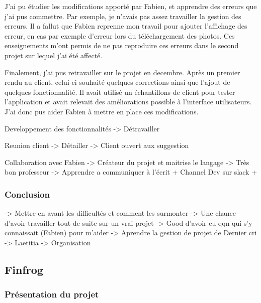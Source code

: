 \documentclass[12pt,a4paper]{article}
\begin{document}
  \bigskip

  J'ai pu étudier les modifications apporté par Fabien, et apprendre des
  erreurs que j'ai pus commettre. Par exemple, je n'avais pas assez
  travailler la gestion des erreurs. Il a fallut que Fabien reprenne mon
  travail pour ajouter l'affichage des erreur, en cas par exemple d'erreur
  lors du téléchargement des photos. Ces enseignements m'ont permis de ne
  pas reproduire ces erreurs dans le second projet sur lequel j'ai été
  affecté.

  \bigskip

  Finalement, j'ai pus retravailler sur le projet en decembre. Après un
  premier rendu au client, celui-ci souhaité quelques corrections ainsi
  que l'ajout de quelques fonctionnalité. Il avait utilisé un échantillons
  de client pour tester l'application et avait relevait des améliorations
  possible à l'interface utilisateurs. J'ai donc pus aider Fabien à mettre
  en place ces modifications.

  Developpement des fonctionnalités -\textgreater{} Détravailler

  Reunion client -\textgreater{} Détailler -\textgreater{} Client ouvert
  aux suggestion

  Collaboration avec Fabien -\textgreater{} Créateur du projet et maitrise
  le langage -\textgreater{} Très bon professeur -\textgreater{} Apprendre
  a communiquer à l'écrit + Channel Dev sur slack +

  \bigskip

  \subsubsection{Conclusion}\label{conclusion}

  -\textgreater{} Mettre en avant les difficultés et comment les surmonter
  -\textgreater{} Une chance d'avoir travailler tout de suite sur un vrai
  projet -\textgreater{} Good d'avoir eu qqn qui s'y connaissait (Fabien)
  pour m'aider -\textgreater{} Aprendre la gestion de projet de Dernier
  cri -\textgreater{} Laetitia -\textgreater{} Organisation

  \bigskip

  \bigskip

  \subsection{Finfrog}\label{finfrog}

  \subsubsection{Présentation du
  projet}\label{pruxe9sentation-du-projet-1}
\end{document}
